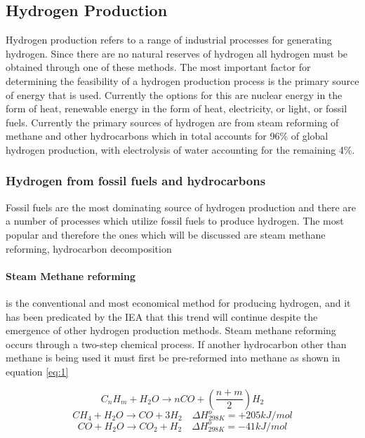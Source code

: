 \subsection{Hydrogen Production}
Hydrogen production refers to a range of industrial processes for generating hydrogen. Since there are no natural reserves of hydrogen all hydrogen must be obtained through one of these methods. The most important factor for determining the feasibility of a hydrogen production process is the primary source of energy that is used. Currently the options for this are nuclear energy in the form of heat, renewable energy in the form of heat, electricity, or light, or fossil fuels. Currently the primary sources of hydrogen are from steam reforming of methane and other hydrocarbons which in total accounts for 96\% of global hydrogen production, with electrolysis of water accounting for the remaining 4\%.
\subsubsection{Hydrogen from fossil fuels and hydrocarbons}
Fossil fuels are the most dominating source of hydrogen production and there are a number of processes which utilize fossil fuels to produce hydrogen. The most popular and therefore the ones which will be discussed are steam methane reforming, hydrocarbon decomposition
\paragraph{Steam Methane reforming}
is the conventional and most economical method for producing hydrogen, and it has been predicated by the IEA that this trend will continue despite the emergence of other hydrogen production methods. Steam methane reforming occurs through a two-step chemical process. If another hydrocarbon other than methane is being used it must first be pre-reformed into methane as shown in equation \ref{eq:1}

\begin{equation} \label{eq:1}
    C_n H_m + H_2 O \rightarrow nCO +(\frac{n+m}{2})H_2 
\end{equation}
\begin{equation}\label{eq:2}
    CH_4 + H_2 O \rightarrow CO + 3H_2 \quad \Delta H_{298K}^o = +205 kJ/mol
\end{equation}
\begin{equation}\label{eq:3}
    CO+ H_2 O \rightarrow CO_2 + H_2 \quad \Delta H_{298K}^o = -41 kJ/mol
\end{equation}

